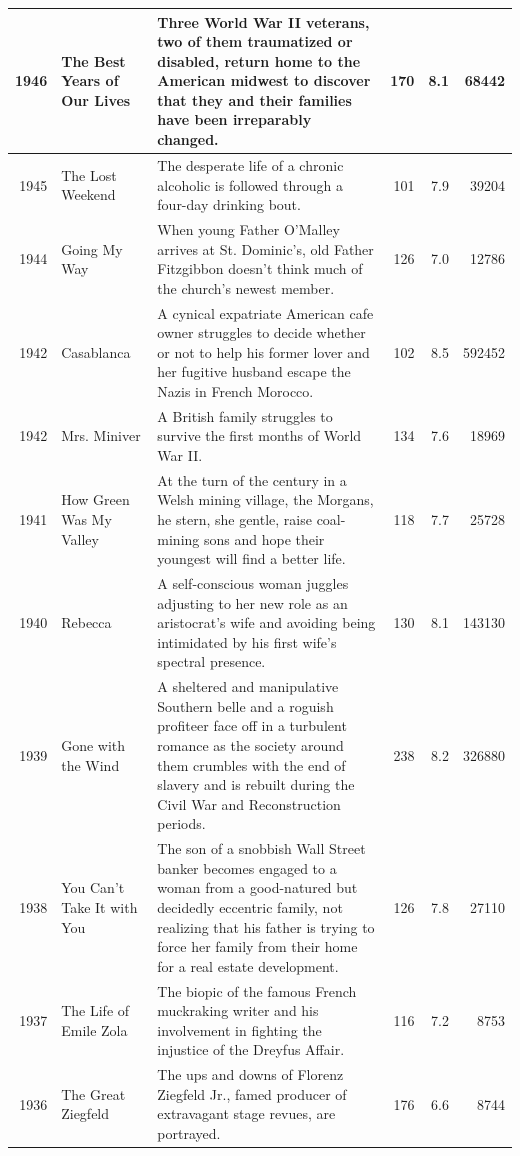 \documentclass[
]{book}
\begin{document}
\begin{tabular}{r|l|l|r|r|r}
\hline
1946 & The Best Years of Our Lives & Three World War II veterans, two of them traumatized or disabled, return home to the American midwest to discover that they and their families have been irreparably changed. & 170 & 8.1 & 68442\\
\hline
1945 & The Lost Weekend & The desperate life of a chronic alcoholic is followed through a four-day drinking bout. & 101 & 7.9 & 39204\\
\hline
1944 & Going My Way & When young Father O'Malley arrives at St. Dominic's, old Father Fitzgibbon doesn't think much of the church's newest member. & 126 & 7.0 & 12786\\
\hline
1942 & Casablanca & A cynical expatriate American cafe owner struggles to decide whether or not to help his former lover and her fugitive husband escape the Nazis in French Morocco. & 102 & 8.5 & 592452\\
\hline
1942 & Mrs. Miniver & A British family struggles to survive the first months of World War II. & 134 & 7.6 & 18969\\
\hline
1941 & How Green Was My Valley & At the turn of the century in a Welsh mining village, the Morgans, he stern, she gentle, raise coal-mining sons and hope their youngest will find a better life. & 118 & 7.7 & 25728\\
\hline
1940 & Rebecca & A self-conscious woman juggles adjusting to her new role as an aristocrat's wife and avoiding being intimidated by his first wife's spectral presence. & 130 & 8.1 & 143130\\
\hline
1939 & Gone with the Wind & A sheltered and manipulative Southern belle and a roguish profiteer face off in a turbulent romance as the society around them crumbles with the end of slavery and is rebuilt during the Civil War and Reconstruction periods. & 238 & 8.2 & 326880\\
\hline
1938 & You Can't Take It with You & The son of a snobbish Wall Street banker becomes engaged to a woman from a good-natured but decidedly eccentric family, not realizing that his father is trying to force her family from their home for a real estate development. & 126 & 7.8 & 27110\\
\hline
1937 & The Life of Emile Zola & The biopic of the famous French muckraking writer and his involvement in fighting the injustice of the Dreyfus Affair. & 116 & 7.2 & 8753\\
\hline
1936 & The Great Ziegfeld & The ups and downs of Florenz Ziegfeld Jr., famed producer of extravagant stage revues, are portrayed. & 176 & 6.6 & 8744\\

\end{tabular}
\end{document}
